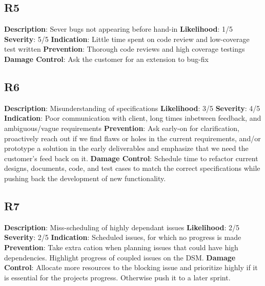 \documentclass{article}
\begin{document}
\subsection{R5}
\textbf{Description}: Sever bugs not appearing before hand-in \newline
\textbf{Likelihood}: 1/5\newline
\textbf{Severity}: 5/5  \newline
\textbf{Indication}: Little time spent on code review and low-coverage test written \newline
\textbf{Prevention}: Thorough code reviews and high coverage testings \newline
\textbf{Damage Control}: Ask the customer for an extension to bug-fix \newline

\subsection{R6}
\textbf{Description}: Misunderstanding of specifications \newline
\textbf{Likelihood}: 3/5\newline
\textbf{Severity}: 4/5 \newline
\textbf{Indication}: Poor communication with client, long times inbetween feedback, and ambiguous/vague requirements \newline
\textbf{Prevention}: Ask early-on for clarification, proactively reach out if we find flaws or holes in the current requirements, and/or prototype a solution in the early deliverables and emphasize that we need the customer's feed back on it.\newline
\textbf{Damage Control}: Schedule time to refactor current designs, documents, code, and test cases to match the correct specifications while pushing back the development of new functionality. \newline

\subsection{R7}
\textbf{Description}: Miss-scheduling of highly dependant issues \newline
\textbf{Likelihood}: 2/5\newline
\textbf{Severity}: 2/5\newline
\textbf{Indication}: Scheduled issues, for which no progress is made \newline
\textbf{Prevention}: Take extra cation when planning issues that could have high dependencies. Highlight progress of coupled issues on the DSM. \newline
\textbf{Damage Control}: Allocate more resources to the blocking issue and prioritize highly if it is essential for the projects progress. Otherwise push it to a later sprint.  \newline
\end{document}
